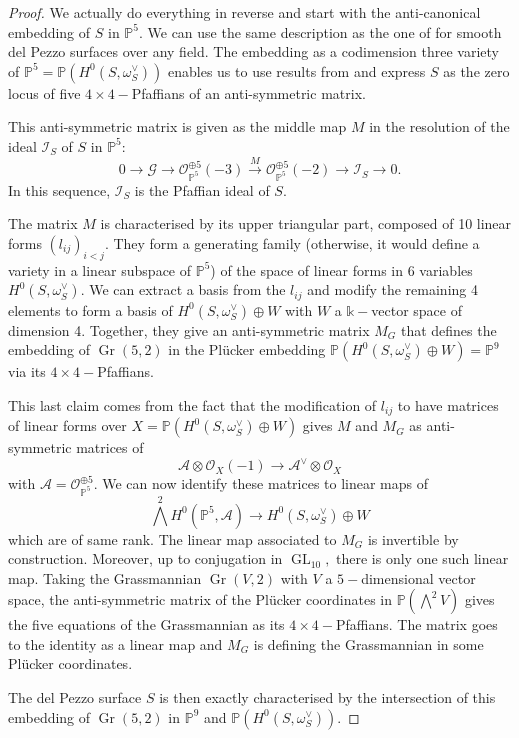 \documentclass{amsart}
\theoremstyle{plain}%
\theoremstyle{remark}
\theoremstyle{definition}
\newcommand{\cA}{\mathcal{A}}
\newcommand{\cG}{\mathcal{G}}
\newcommand{\cI}{\mathcal{I}}
\newcommand{\cO}{\mathcal{O}}
\newcommand{\ek}{\mathbb{k}}
\newcommand{\eP}{\mathbb{P}}
\newcommand{\Gl}{\operatorname{GL}}
\newcommand{\Grass}{\operatorname{Gr}}
\begin{document}
\begin{proof}
We actually do everything in reverse and start with the anti-canonical embedding of $S$ in $\eP^5$. We can use the same description as the one of \cite{BC21} for smooth del Pezzo surfaces over any field. The embedding as a codimension three variety of $\eP^5 = \eP(H^0(S,\omega_S^\vee))$ enables us to use results from \cite{BE77} and express $S$ as the zero locus of five $4\times4-$Pfaffians of an anti-symmetric matrix. 

This anti-symmetric matrix is given as the middle map $M$ in the resolution of the ideal $\cI_S$ of $S$ in $\eP^5$:
\[0\to \cG \to \cO_{\eP^5}^{\oplus 5}(-3) \overset{M}{\to} \cO_{\eP^5}^{\oplus 5}(-2) \to \cI_S \to 0.\]
In this sequence, $\cI_S$ is the Pfaffian ideal of $S$. 

The matrix $M$ is characterised by its upper triangular part, composed of 10 linear forms $(l_{ij})_{i< j}$. They form a generating family (otherwise, it would define a variety in a linear subspace of $\eP^5$) of the space of linear forms in 6 variables $H^0(S,\omega_S^\vee)$. We can extract a basis from the $l_{ij}$ and modify the remaining 4 elements to form a basis of $H^0(S,\omega_S^\vee)\oplus W$ with $W$ a $\ek-$vector space of dimension 4. Together, they give an anti-symmetric matrix $M_G$ that defines the embedding of $\Grass(5,2)$ in the Plücker embedding $\eP(H^0(S,\omega_S^\vee)\oplus W) = \eP^9$ via its $4\times 4-$Pfaffians. 

This last claim comes from the fact that the modification of $l_{ij}$ to have matrices of linear forms over $X = \eP(H^0(S,\omega_S^\vee)\oplus W)$ gives $M$ and $M_G$ as anti-symmetric matrices of
\[\cA\otimes \cO_X(-1) \to \cA^\vee \otimes \cO_X\]
with $\cA = \cO_{\eP^5}^{\oplus 5}.$ We can now identify these matrices to linear maps of
\[\bigwedge^2H^0(\eP^5,\cA) \to H^0(S,\omega_S^\vee)\oplus W\]
which are of same rank. The linear map associated to $M_G$ is invertible by construction. Moreover, up to conjugation in $\Gl_{10},$ there is only one such linear map. Taking the Grassmannian $\Grass(V,2)$ with $V$ a $5-$dimensional vector space, the anti-symmetric matrix of the Plücker coordinates in $\eP(\bigwedge^2V)$ gives the five equations of the Grassmannian as its $4\times 4-$Pfaffians. The matrix goes to the identity as a linear map and $M_G$ is defining the Grassmannian in some Plücker coordinates.

The del Pezzo surface $S$ is then exactly characterised by the intersection of this embedding of $\Grass(5,2)$ in $\eP^9$ and $\eP(H^0(S,\omega_S^\vee)).$


\end{proof}
\end{document}
